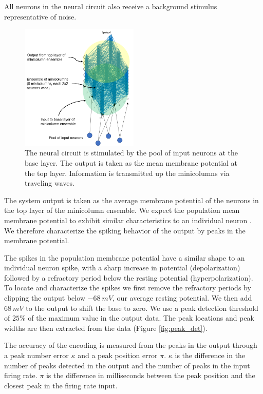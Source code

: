 \documentclass[a4paper,11pt]{article}
\begin{document}
All neurons in the neural circuit also receive a background stimulus representative of noise.

\begin{figure}[!ht]
 \caption{The neural circuit is stimulated by the pool of input neurons at the base layer. The output is taken as the mean membrane potential at the top layer. Information is transmitted up the minicolumns via traveling waves. }
 \label{fig:system_diagram}
 \centering
   \includegraphics[width=0.5\textwidth]{fig/SystemDiagram}
\end{figure}

The system output is taken as the average membrane potential of the neurons in the top layer of the minicolumn ensemble.
We expect the population mean membrane potential to exhibit similar characteristics to an individual neuron \cite{trappenberg}.
We therefore characterize the spiking behavior of the output by peaks in the membrane potential.

The spikes in the population membrane potential have a similar shape to an individual neuron spike, with a sharp increase in potential (depolarization) followed by a refractory period below the resting potential (hyperpolarization).
To locate and characterize the spikes we first remove the refractory periods by clipping the output below $-68\ mV$, our average resting potential.
We then add $68\ mV$ to the output to shift the base to zero.
We use a peak detection threshold of $25\%$ of the maximum value in the output data.
The peak locations and peak widths are then extracted from the data (Figure \ref{fig:peak_det}).

The accuracy of the encoding is measured from the peaks in the output through a peak number error $\kappa$ and a peak position error $\pi$.
$\kappa$ is the difference in the number of peaks detected in the output and the number of peaks in the input firing rate.
$\pi$ is the difference in milliseconds between the peak position and the closest peak in the firing rate input.
\end{document}
